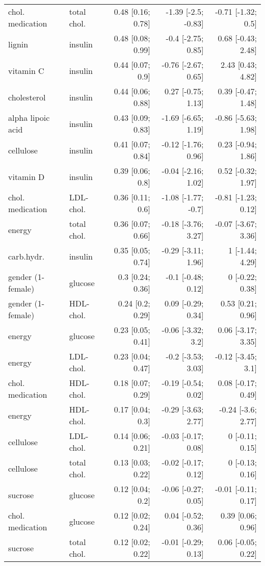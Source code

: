 \documentclass[border=1mm, preview]{standalone}
\begin{document}
\begin{table}[H]
\begin{tabular}{llrrr}
chol. medication & total chol. & 0.48 [0.16; 0.78] & -1.39 [-2.5; -0.83] & -0.71 [-1.32; 0.5]\\
lignin & insulin & 0.48 [0.08; 0.99] & -0.4 [-2.75; 0.85] & 0.68 [-0.43; 2.48]\\
vitamin C & insulin & 0.44 [0.07; 0.9] & -0.76 [-2.67; 0.65] & 2.43 [0.43; 4.82]\\
\addlinespace
cholesterol & insulin & 0.44 [0.06; 0.88] & 0.27 [-0.75; 1.13] & 0.39 [-0.47; 1.48]\\
alpha lipoic acid & insulin & 0.43 [0.09; 0.83] & -1.69 [-6.65; 1.19] & -0.86 [-5.63; 1.98]\\
cellulose & insulin & 0.41 [0.07; 0.84] & -0.12 [-1.76; 0.96] & 0.23 [-0.94; 1.86]\\
vitamin D & insulin & 0.39 [0.06; 0.8] & -0.04 [-2.16; 1.02] & 0.52 [-0.32; 1.97]\\
chol. medication & LDL-chol. & 0.36 [0.11; 0.6] & -1.08 [-1.77; -0.7] & -0.81 [-1.23; 0.12]\\
\addlinespace
energy & total chol. & 0.36 [0.07; 0.66] & -0.18 [-3.76; 3.27] & -0.07 [-3.67; 3.36]\\
carb.hydr. & insulin & 0.35 [0.05; 0.74] & -0.29 [-3.11; 1.96] & 1 [-1.44; 4.29]\\
gender (1-female) & glucose & 0.3 [0.24; 0.36] & -0.1 [-0.48; 0.12] & 0 [-0.22; 0.38]\\
gender (1-female) & HDL-chol. & 0.24 [0.2; 0.29] & 0.09 [-0.29; 0.34] & 0.53 [0.21; 0.96]\\
energy & glucose & 0.23 [0.05; 0.41] & -0.06 [-3.32; 3.2] & 0.06 [-3.17; 3.35]\\
\addlinespace
energy & LDL-chol. & 0.23 [0.04; 0.47] & -0.2 [-3.53; 3.03] & -0.12 [-3.45; 3.1]\\
chol. medication & HDL-chol. & 0.18 [0.07; 0.29] & -0.19 [-0.54; 0.02] & 0.08 [-0.17; 0.49]\\
energy & HDL-chol. & 0.17 [0.04; 0.3] & -0.29 [-3.63; 2.77] & -0.24 [-3.6; 2.77]\\
cellulose & LDL-chol. & 0.14 [0.06; 0.21] & -0.03 [-0.17; 0.08] & 0 [-0.11; 0.15]\\
cellulose & total chol. & 0.13 [0.03; 0.22] & -0.02 [-0.17; 0.12] & 0 [-0.13; 0.16]\\
\addlinespace
sucrose & glucose & 0.12 [0.04; 0.2] & -0.06 [-0.27; 0.05] & -0.01 [-0.11; 0.17]\\
chol. medication & glucose & 0.12 [0.02; 0.24] & 0.04 [-0.52; 0.36] & 0.39 [0.06; 0.96]\\
sucrose & total chol. & 0.12 [0.02; 0.22] & -0.01 [-0.29; 0.13] & 0.06 [-0.05; 0.22]\\
\bottomrule
\end{tabular}
\end{table}
\end{document}
